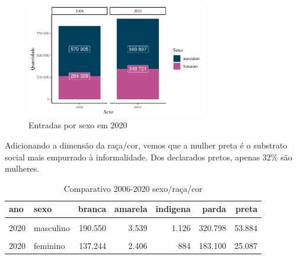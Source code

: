\documentclass[
  12pt,
  letterpaper,
  DIV=11,
  numbers=noendperiod]{scrartcl}
\begin{document}
\begin{figure}

{\centering \includegraphics[width=0.7\textwidth,height=\textheight]{monografia_files/figure-pdf/count sexo-1.pdf}

}

\caption{Entradas por sexo em 2020}

\end{figure}

Adicionando a dimensão da raça/cor, vemos que a mulher preta é o
substrato social mais empurrado à informalidade. Dos declarados pretos,
apenas 32\% são mulheres.

\begin{table}
\caption{Comparativo 2006-2020 sexo/raça/cor}\tabularnewline

\centering
\begin{tabular}[t]{l|l|r|r|r|r|r}
\hline
ano & sexo & branca & amarela & indigena & parda & preta\\
\hline
\cellcolor{gray!6}{2006} & \cellcolor{gray!6}{masculino} & \cellcolor{gray!6}{254.149} & \cellcolor{gray!6}{4.845} & \cellcolor{gray!6}{2.277} & \cellcolor{gray!6}{260.978} & \cellcolor{gray!6}{48.656}\\
\hline
2020 & masculino & 190.550 & 3.539 & 1.126 & 320.798 & 53.884\\
\hline
\cellcolor{gray!6}{2006} & \cellcolor{gray!6}{feminino} & \cellcolor{gray!6}{139.339} & \cellcolor{gray!6}{1.984} & \cellcolor{gray!6}{1.262} & \cellcolor{gray!6}{107.080} & \cellcolor{gray!6}{14.644}\\
\hline
2020 & feminino & 137.244 & 2.406 & 884 & 183.100 & 25.087\\
\hline
\end{tabular}
\end{table}
\end{document}
